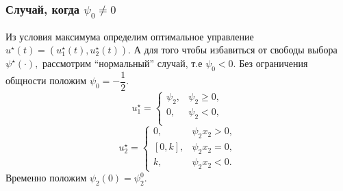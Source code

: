 \documentclass[11pt]{article}
\begin{document}
	\subsubsection{Случай, когда $ \psi_0 \neq 0 $}
	 Из условия максимума определим оптимальное управление $ u^{\star}(t) = (u_1^{\star}(t), u_2^{\star}(t)). $ А для того чтобы избавиться от свободы выбора $ \psi^{\star}(\cdot), $ рассмотрим ``нормальный'' случай, т.е $ \psi_0 < 0. $ Без ограничения общности положим $ \psi_0 = -\dfrac{1}{2}. $
	\begin{equation*}
		u_1^{\star} = 
		\begin{cases}
			\psi_2, & \psi_2 \geqslant 0, \\
			0, & \psi_2 < 0, \\   		
		\end{cases}
   	\end{equation*}
   	\begin{equation*}
   		u_2^{\star} = 
		\begin{cases}
			0, & \psi_2 x_2 > 0, \\
			[0, k], & \psi_2 x_2 = 0, \\ 
			k, & \psi_2 x_2 < 0.
   		\end{cases}
	\end{equation*}
	Временно положим $ \psi_2(0) = \psi_2^0. $
\end{document}
